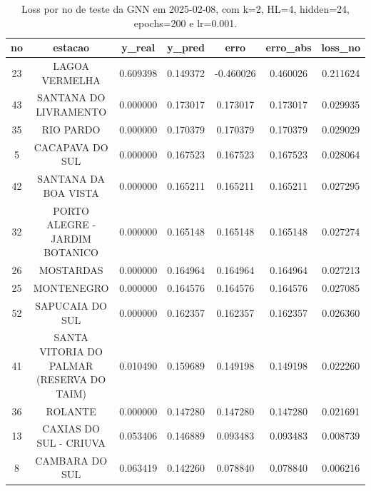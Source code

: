 \begin{table}[h]
\centering
\caption{Loss por no de teste da GNN em 2025-02-08, com k=2, HL=4, hidden=24, epochs=200 e lr=0.001.}
\label{tab:gnn_loss_k2_hl4_h24_e200_d20250208}
\begin{tabular}{ccccccc}
\toprule
no & estacao & y\_real & y\_pred & erro & erro\_abs & loss\_no \\
\midrule
23 & LAGOA VERMELHA & 0.609398 & 0.149372 & -0.460026 & 0.460026 & 0.211624 \\
43 & SANTANA DO LIVRAMENTO & 0.000000 & 0.173017 & 0.173017 & 0.173017 & 0.029935 \\
35 & RIO PARDO & 0.000000 & 0.170379 & 0.170379 & 0.170379 & 0.029029 \\
5 & CACAPAVA DO SUL & 0.000000 & 0.167523 & 0.167523 & 0.167523 & 0.028064 \\
42 & SANTANA DA BOA VISTA & 0.000000 & 0.165211 & 0.165211 & 0.165211 & 0.027295 \\
32 & PORTO ALEGRE - JARDIM BOTANICO & 0.000000 & 0.165148 & 0.165148 & 0.165148 & 0.027274 \\
26 & MOSTARDAS & 0.000000 & 0.164964 & 0.164964 & 0.164964 & 0.027213 \\
25 & MONTENEGRO & 0.000000 & 0.164576 & 0.164576 & 0.164576 & 0.027085 \\
52 & SAPUCAIA DO SUL & 0.000000 & 0.162357 & 0.162357 & 0.162357 & 0.026360 \\
41 & SANTA VITORIA DO PALMAR (RESERVA DO TAIM) & 0.010490 & 0.159689 & 0.149198 & 0.149198 & 0.022260 \\
36 & ROLANTE & 0.000000 & 0.147280 & 0.147280 & 0.147280 & 0.021691 \\
13 & CAXIAS DO SUL - CRIUVA & 0.053406 & 0.146889 & 0.093483 & 0.093483 & 0.008739 \\
8 & CAMBARA DO SUL & 0.063419 & 0.142260 & 0.078840 & 0.078840 & 0.006216 \\
\bottomrule
\end{tabular}
\end{table}
